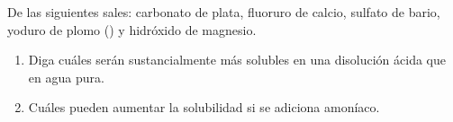 De las siguientes sales: carbonato de plata, fluoruro de calcio, sulfato de bario, yoduro de plomo () y hidróxido de magnesio.
\begin{enumerate}[label={\alph*)},font={\color{red!50!black}\bfseries}]
    \item Diga cuáles serán sustancialmente más solubles en una disolución ácida que en agua pura.
    \item Cuáles pueden aumentar la solubilidad si se adiciona amoníaco.
\end{enumerate}
